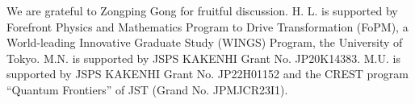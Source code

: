 \documentclass[aps,prl,twocolumn,superscriptaddress,]{revtex4-1}
\begin{document}
We are grateful to Zongping Gong for fruitful discussion. H. L. is
supported by Forefront Physics and Mathematics Program to Drive Transformation
(FoPM), a World-leading Innovative Graduate Study (WINGS) Program,
the University of Tokyo. M.N. is supported by JSPS KAKENHI Grant No.
JP20K14383. M.U. is supported by JSPS KAKENHI Grant No. JP22H01152
and the CREST program “Quantum Frontiers” of JST (Grand No. JPMJCR23I1).



\end{document}
